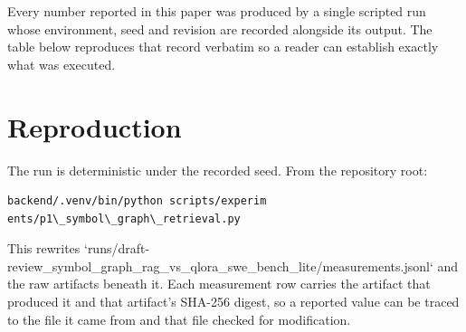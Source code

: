 \documentclass[10pt,twocolumn,letterpaper]{article}
\begin{document}
Every number reported in this paper was produced by a single scripted run whose environment, seed and revision are recorded alongside its output. The table below reproduces that record verbatim so a reader can establish exactly what was executed.
\begin{table}[htbp]
\centering
{}
\end{table}


\section{Reproduction}


The run is deterministic under the recorded seed. From the repository root:


\begin{scriptsize}
\begin{verbatim}
backend/.venv/bin/python scripts/experim
ents/p1\_symbol\_graph\_retrieval.py
\end{verbatim}
\end{scriptsize}


This rewrites `runs/draft-review\_symbol\_graph\_rag\_vs\_qlora\_swe\_bench\_lite/measurements.jsonl` and the raw artifacts beneath it. Each measurement row carries the artifact that produced it and that artifact's SHA-256 digest, so a reported value can be traced to the file it came from and that file checked for modification.
\end{document}
